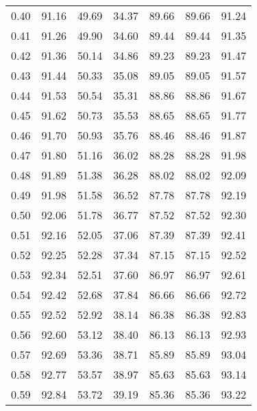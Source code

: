 \begin{tabular}{|c|c|c|c|c|c|c|}
      0.40 &     91.16 &     49.69 &      34.37 &   89.66 &      89.66 &         91.24 \\
      0.41 &     91.26 &     49.90 &      34.60 &   89.44 &      89.44 &         91.35 \\
      0.42 &     91.36 &     50.14 &      34.86 &   89.23 &      89.23 &         91.47 \\
      0.43 &     91.44 &     50.33 &      35.08 &   89.05 &      89.05 &         91.57 \\
      0.44 &     91.53 &     50.54 &      35.31 &   88.86 &      88.86 &         91.67 \\
      0.45 &     91.62 &     50.73 &      35.53 &   88.65 &      88.65 &         91.77 \\
      0.46 &     91.70 &     50.93 &      35.76 &   88.46 &      88.46 &         91.87 \\
      0.47 &     91.80 &     51.16 &      36.02 &   88.28 &      88.28 &         91.98 \\
      0.48 &     91.89 &     51.38 &      36.28 &   88.02 &      88.02 &         92.09 \\
      0.49 &     91.98 &     51.58 &      36.52 &   87.78 &      87.78 &         92.19 \\
      0.50 &     92.06 &     51.78 &      36.77 &   87.52 &      87.52 &         92.30 \\
      0.51 &     92.16 &     52.05 &      37.06 &   87.39 &      87.39 &         92.41 \\
      0.52 &     92.25 &     52.28 &      37.34 &   87.15 &      87.15 &         92.52 \\
      0.53 &     92.34 &     52.51 &      37.60 &   86.97 &      86.97 &         92.61 \\
      0.54 &     92.42 &     52.68 &      37.84 &   86.66 &      86.66 &         92.72 \\
      0.55 &     92.52 &     52.92 &      38.14 &   86.38 &      86.38 &         92.83 \\
      0.56 &     92.60 &     53.12 &      38.40 &   86.13 &      86.13 &         92.93 \\
      0.57 &     92.69 &     53.36 &      38.71 &   85.89 &      85.89 &         93.04 \\
      0.58 &     92.77 &     53.57 &      38.97 &   85.63 &      85.63 &         93.14 \\
      0.59 &     92.84 &     53.72 &      39.19 &   85.36 &      85.36 &         93.22 \\

\end{tabular}
